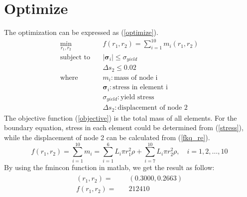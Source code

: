\documentclass[12pt, a4paper]{article}
\begin{document}
\section{Optimize}
    \qquad The optimization can be expressed as (\ref{optimize}).
    \begin{equation}
        \label{optimize}
        \begin{split}
            \min_{r_1,r_2} & \quad f(r_1,r_2)= \sum_{i=1}^{10}m_i(r_1,r_2)\\
            \textrm{subject to} & \quad |\mathbf{\sigma}_i| \leq\sigma_{yield}\\
            & \quad \Delta s_2 \leq 0.02\\
            \textrm{where} & \quad m_i: \textrm{mass of node i}\\
            &\quad \mathbf{\sigma}_i: \textrm{stress in element i}\\
            &\quad \sigma_{yield}: \textrm{yield stress}\\
            &\quad \Delta s_2: \textrm{displacement of node 2}
        \end{split}
    \end{equation}
    \qquad The objective function (\ref{objective}) is the total mass of all elements. For the boundary equation, stress in each element could be determined from (\ref{stress}), while the displacement of node 2 can be calculated from (\ref{fkq_re}).
    \begin{equation}
        \label{objective}
        f(r_1,r_2)= \sum_{i=1}^{10}m_i=\sum_{i=1}^{6}L_{i}\pi r_1^2 \rho + \sum_{i=7}^{10}L_{i}\pi r_2^2 \rho, \quad i=1,2,\ldots,10
    \end{equation}
    \qquad By using the fmincon function in matlab, we get the result as follow:
    \begin{align}
    \label{result}
    \begin{split}
     (r_1,r_2)=&\quad (0.3000,0.2663)\\
    f(r_1,r_2)=&\quad 212410
    \end{split}
    \end{align}
    
\end{document}
